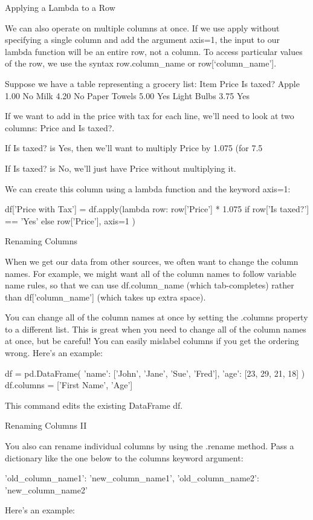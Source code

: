\documentclass{journal}
\begin{document}
Applying a Lambda to a Row

We can also operate on multiple columns at once. If we use apply without specifying a single column and add the argument axis=1, the input to our lambda function will be an entire row, not a column. To access particular values of the row, we use the syntax row.column_name or row[‘column_name’].

Suppose we have a table representing a grocery list:
Item 	Price 	Is taxed?
Apple 	1.00 	No
Milk 	4.20 	No
Paper Towels 	5.00 	Yes
Light Bulbs 	3.75 	Yes

If we want to add in the price with tax for each line, we’ll need to look at two columns: Price and Is taxed?.

If Is taxed? is Yes, then we’ll want to multiply Price by 1.075 (for 7.5%

If Is taxed? is No, we’ll just have Price without multiplying it.

We can create this column using a lambda function and the keyword axis=1:

df['Price with Tax'] = df.apply(lambda row:
     row['Price'] * 1.075
     if row['Is taxed?'] == 'Yes'
     else row['Price'],
     axis=1
)

Renaming Columns

When we get our data from other sources, we often want to change the column names. For example, we might want all of the column names to follow variable name rules, so that we can use df.column_name (which tab-completes) rather than df['column_name'] (which takes up extra space).

You can change all of the column names at once by setting the .columns property to a different list. This is great when you need to change all of the column names at once, but be careful! You can easily mislabel columns if you get the ordering wrong. Here's an example:

df = pd.DataFrame({
    'name': ['John', 'Jane', 'Sue', 'Fred'],
    'age': [23, 29, 21, 18]
})
df.columns = ['First Name', 'Age']

This command edits the existing DataFrame df.


Renaming Columns II

You also can rename individual columns by using the .rename method. Pass a dictionary like the one below to the columns keyword argument:

{'old_column_name1': 'new_column_name1', 'old_column_name2': 'new_column_name2'}

Here's an example:
\end{document}
